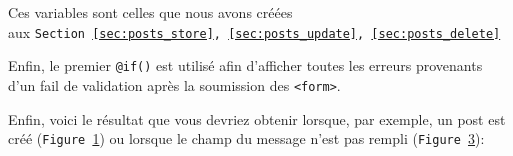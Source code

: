 \documentclass[internal]{nhitec_design}
\begin{document}
Ces variables sont celles que nous avons créées \\ aux \texttt{Section~\ref{sec:posts_store},~\ref{sec:posts_update},~\ref{sec:posts_delete}}

Enfin, le premier \verb|@if()| est utilisé afin d'afficher toutes les erreurs provenants d'un fail de validation après la soumission des \verb|<form>|.

\vspace{4cm}

Enfin, voici le résultat que vous devriez obtenir lorsque, par exemple, un post est créé (\texttt{Figure~\ref{fig:messages_create}}) ou lorsque le champ du message n'est pas rempli (\texttt{Figure~\ref{fig:messages_error}}):

\begin{figure}[!h]
    \begin{subfigure}[c]{0.42\textwidth}
        \caption{\label{fig:messages_create}}
    \end{subfigure}
    \hspace{0.2cm}
    \begin{subfigure}[c]{0.52\textwidth}
        \caption{\label{fig:messages_error}}
    \end{subfigure}
    \caption{}
\end{figure}
\end{document}
